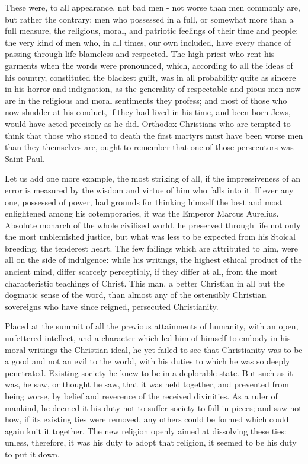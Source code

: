 These were, to all appearance, not bad men - not worse than men commonly are, but rather the contrary; men who possessed in a full, or somewhat more than a full measure, the religious, moral, and patriotic feelings of their time and people: the very kind of men who, in all times, our own included, have every chance of passing through life blameless and respected. The high-priest who rent his garments when the words were pronounced, which, according to all the ideas of his country, constituted the blackest guilt, was in all probability quite as sincere in his horror and indignation, as the generality of respectable and pious men now are in the religious and moral sentiments they profess; and most of those who now shudder at his conduct, if they had lived in his time, and been born Jews, would have acted precisely as he did. Orthodox Christians who are tempted to think that those who stoned to death the first martyrs must have been worse men than they themselves are, ought to remember that one of those persecutors was Saint Paul.\par

Let us add one more example, the most striking of all, if the impressiveness of an error is measured by the wisdom and virtue of him who falls into it. If ever any one, possessed of power, had grounds for thinking himself the best and most enlightened among his cotemporaries, it was the Emperor Marcus Aurelius. Absolute monarch of the whole civilised world, he preserved through life not only the most unblemished justice, but what was less to be expected from his Stoical breeding, the tenderest heart. The few failings which are attributed to him, were all on the side of indulgence: while his writings, the highest ethical product of the ancient mind, differ scarcely perceptibly, if they differ at all, from the most characteristic teachings of Christ. This man, a better Christian in all but the dogmatic sense of the word, than almost any of the ostensibly Christian sovereigns who have since reigned, persecuted Christianity.\par

Placed at the summit of all the previous attainments of humanity, with an open, unfettered intellect, and a character which led him of himself to embody in his moral writings the Christian ideal, he yet failed to see that Christianity was to be a good and not an evil to the world, with his duties to which he was so deeply penetrated. Existing society he knew to be in a deplorable state. But such as it was, he saw, or thought he saw, that it was held together, and prevented from being worse, by belief and reverence of the received divinities. As a ruler of mankind, he deemed it his duty not to suffer society to fall in pieces; and saw not how, if its existing ties were removed, any others could be formed which could again knit it together. The new religion openly aimed at dissolving these ties: unless, therefore, it was his duty to adopt that religion, it seemed to be his duty to put it down.\par

